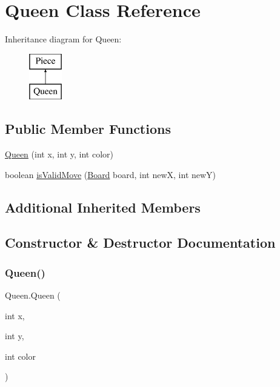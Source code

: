 \hypertarget{class_queen}{}\section{Queen Class Reference}
\label{class_queen}
Inheritance diagram for Queen\+:\begin{figure}[H]
\begin{center}
\leavevmode
\includegraphics[height=2.000000cm]{class_queen}
\end{center}
\end{figure}
\subsection*{Public Member Functions}
\begin{DoxyCompactItemize}
\item 
\mbox{\hyperlink{class_queen_a392540e8f864b0625b3d2588c82a9865}{Queen}} (int x, int y, int color)
\item 
boolean \mbox{\hyperlink{class_queen_ac0195712d58628ae2889f400f4dab061}{is\+Valid\+Move}} (\mbox{\hyperlink{class_board}{Board}} board, int newX, int newY)
\end{DoxyCompactItemize}
\subsection*{Additional Inherited Members}


\subsection{Constructor \& Destructor Documentation}
\mbox{\label{class_queen_a392540e8f864b0625b3d2588c82a9865}} 
\subsubsection{\texorpdfstring{Queen()}{Queen()}}
{\footnotesize\ttfamily Queen.\+Queen (\begin{DoxyParamCaption}\item[{int}]{x,  }\item[{int}]{y,  }\item[{int}]{color }\end{DoxyParamCaption})\hspace{0.3cm}{\ttfamily [inline]}}

